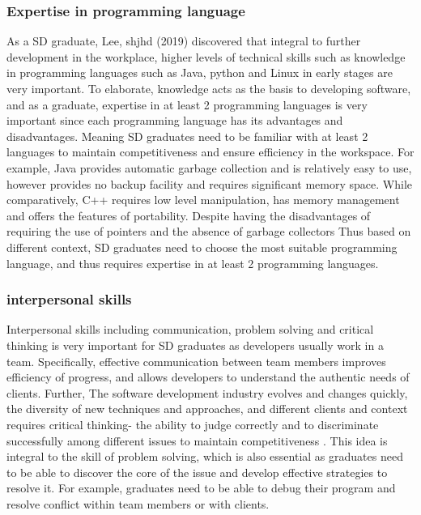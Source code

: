 \documentclass[a4paper, 11pt]{report}
\begin{document}
\subsubsection{Expertise in programming language}
As a SD graduate, Lee, shjhd (2019) discovered that integral to further development in the workplace, higher levels of technical skills such as knowledge in programming languages such as Java, python and Linux in early stages are very important. To elaborate, knowledge acts as the basis to developing software, and as a graduate, expertise in at least 2 programming languages is very important since each programming language has its advantages and disadvantages. Meaning SD graduates need to be familiar with at least 2 languages to maintain competitiveness and ensure efficiency in the workspace. For example, Java provides automatic garbage collection and is relatively easy to use, however provides no backup facility and requires significant memory space. While comparatively, C++ requires low level manipulation, has memory management and offers the features of portability. Despite having the disadvantages of requiring the use of pointers and the absence of garbage collectors \cite{jain2020review} Thus based on different context, SD graduates need to choose the most suitable programming language, and thus requires expertise in at least 2 programming languages.

\subsubsection{interpersonal skills}
Interpersonal skills including communication, problem solving and critical thinking is very important for SD graduates as developers usually work in a team. Specifically, effective communication between team members improves efficiency of progress, and allows developers to understand the authentic needs of clients. Further, The software development industry evolves and changes quickly, the diversity of new techniques and approaches, and different clients and context requires critical thinking- the ability to judge correctly and to discriminate successfully among different issues to maintain competitiveness \cite{chouseinoglou2014introducing}. This idea is integral to the skill of problem solving, which is also essential as graduates need to be able to discover the core of the issue and develop effective strategies to resolve it. For example, graduates need to be able to debug their program and resolve conflict within team members or with clients. 
\end{document}
